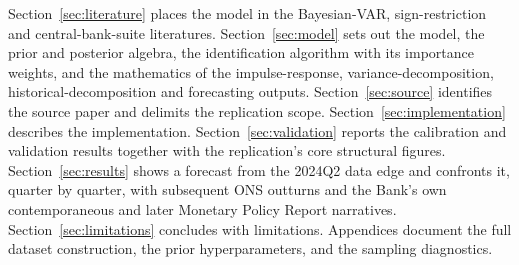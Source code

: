 Section~\ref{sec:literature} places the model in the Bayesian-VAR, sign-restriction and central-bank-suite literatures. Section~\ref{sec:model} sets out the model, the prior and posterior algebra, the identification algorithm with its importance weights, and the mathematics of the impulse-response, variance-decomposition, historical-decomposition and forecasting outputs. Section~\ref{sec:source} identifies the source paper and delimits the replication scope. Section~\ref{sec:implementation} describes the implementation. Section~\ref{sec:validation} reports the calibration and validation results together with the replication's core structural figures. Section~\ref{sec:results} shows a forecast from the 2024Q2 data edge and confronts it, quarter by quarter, with subsequent ONS outturns and the Bank's own contemporaneous and later Monetary Policy Report narratives. Section~\ref{sec:limitations} concludes with limitations. Appendices document the full dataset construction, the prior hyperparameters, and the sampling diagnostics.
